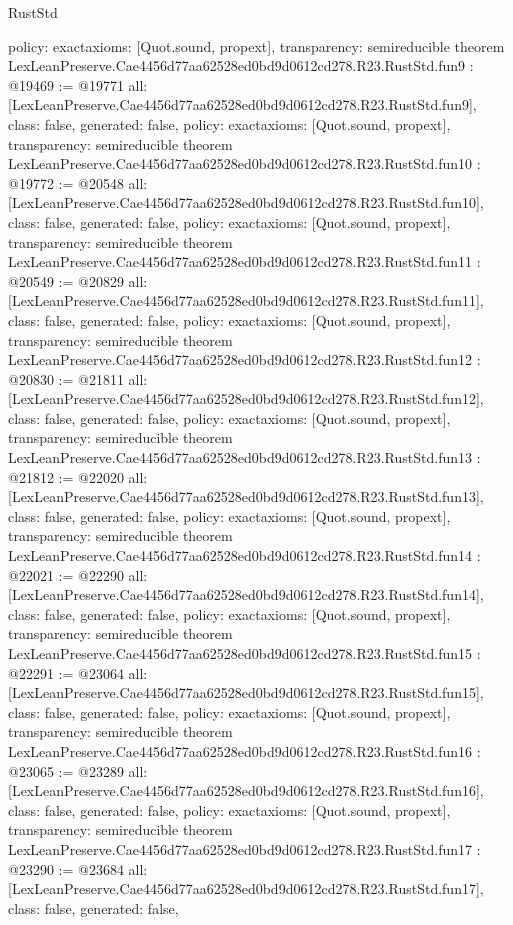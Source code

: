 \begin{lexlean}{RustStd}
\begin{coremodule}
{  policy: exact{axioms: [Quot.sound, propext]},
  transparency: semireducible
}
theorem LexLeanPreserve.Cae4456d77aa62528ed0bd9d0612cd278.R23.RustStd.fun9 : @19469 := @19771 {
  all: [LexLeanPreserve.Cae4456d77aa62528ed0bd9d0612cd278.R23.RustStd.fun9],
  class: false,
  generated: false,
  policy: exact{axioms: [Quot.sound, propext]},
  transparency: semireducible
}
theorem LexLeanPreserve.Cae4456d77aa62528ed0bd9d0612cd278.R23.RustStd.fun10 : @19772 := @20548 {
  all: [LexLeanPreserve.Cae4456d77aa62528ed0bd9d0612cd278.R23.RustStd.fun10],
  class: false,
  generated: false,
  policy: exact{axioms: [Quot.sound, propext]},
  transparency: semireducible
}
theorem LexLeanPreserve.Cae4456d77aa62528ed0bd9d0612cd278.R23.RustStd.fun11 : @20549 := @20829 {
  all: [LexLeanPreserve.Cae4456d77aa62528ed0bd9d0612cd278.R23.RustStd.fun11],
  class: false,
  generated: false,
  policy: exact{axioms: [Quot.sound, propext]},
  transparency: semireducible
}
theorem LexLeanPreserve.Cae4456d77aa62528ed0bd9d0612cd278.R23.RustStd.fun12 : @20830 := @21811 {
  all: [LexLeanPreserve.Cae4456d77aa62528ed0bd9d0612cd278.R23.RustStd.fun12],
  class: false,
  generated: false,
  policy: exact{axioms: [Quot.sound, propext]},
  transparency: semireducible
}
theorem LexLeanPreserve.Cae4456d77aa62528ed0bd9d0612cd278.R23.RustStd.fun13 : @21812 := @22020 {
  all: [LexLeanPreserve.Cae4456d77aa62528ed0bd9d0612cd278.R23.RustStd.fun13],
  class: false,
  generated: false,
  policy: exact{axioms: [Quot.sound, propext]},
  transparency: semireducible
}
theorem LexLeanPreserve.Cae4456d77aa62528ed0bd9d0612cd278.R23.RustStd.fun14 : @22021 := @22290 {
  all: [LexLeanPreserve.Cae4456d77aa62528ed0bd9d0612cd278.R23.RustStd.fun14],
  class: false,
  generated: false,
  policy: exact{axioms: [Quot.sound, propext]},
  transparency: semireducible
}
theorem LexLeanPreserve.Cae4456d77aa62528ed0bd9d0612cd278.R23.RustStd.fun15 : @22291 := @23064 {
  all: [LexLeanPreserve.Cae4456d77aa62528ed0bd9d0612cd278.R23.RustStd.fun15],
  class: false,
  generated: false,
  policy: exact{axioms: [Quot.sound, propext]},
  transparency: semireducible
}
theorem LexLeanPreserve.Cae4456d77aa62528ed0bd9d0612cd278.R23.RustStd.fun16 : @23065 := @23289 {
  all: [LexLeanPreserve.Cae4456d77aa62528ed0bd9d0612cd278.R23.RustStd.fun16],
  class: false,
  generated: false,
  policy: exact{axioms: [Quot.sound, propext]},
  transparency: semireducible
}
theorem LexLeanPreserve.Cae4456d77aa62528ed0bd9d0612cd278.R23.RustStd.fun17 : @23290 := @23684 {
  all: [LexLeanPreserve.Cae4456d77aa62528ed0bd9d0612cd278.R23.RustStd.fun17],
  class: false,
  generated: false,
}
\end{coremodule}
\end{lexlean}
